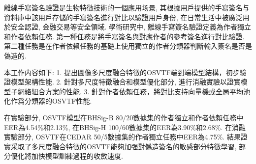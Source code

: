 離線手寫簽名驗證是生物特徵技術的一個應用场景, 其根據用戶提供的手寫簽名与資料庫中該用戶存儲的手寫簽名進行對比以驗證用戶身份, 在日常生活中被廣泛用於安全認證, 金融交易等安全領域. 學術研究中, 離線手寫簽名驗證定義為作者獨立和作者依賴任務. 第一種任務是將手寫簽名與對應作者的參考簽名進行對比驗證. 第二種任務是在作者依賴任務的基礎上使用獨立的作者分類器判斷輸入簽名是否是偽造的.

本工作内容如下: 1. 提出圖像多尺度融合特徵的OSVTF端到端模型結構，初步驗證模型架構性能. 2. 針對多尺度特徵融合和模型優化部分, 進行消融實驗以證實模型子網絡組合方案的性能. 3. 針對作者依賴任務，將對比支持向量機或全局平均池化作爲分類器的OSVTF性能.

在實驗部分, OSVTF模型在BHSig-B 80/20數據集的作者獨立和作者依賴任務中EER為4.54\%和2.13\%, 在BHSig-H 100/60數據集的EER為3.90\%和2.68\%. 在消融實驗部分, OSVTF在CEDAR 50/5數據集的作者獨立任務中EER為4.75\%. 結果證實采取了多尺度融合特徵的OSVTF能夠加强對僞造簽名的敏感部分特徵學習, 部分優化將加快模型訓練過程的收斂速度.










